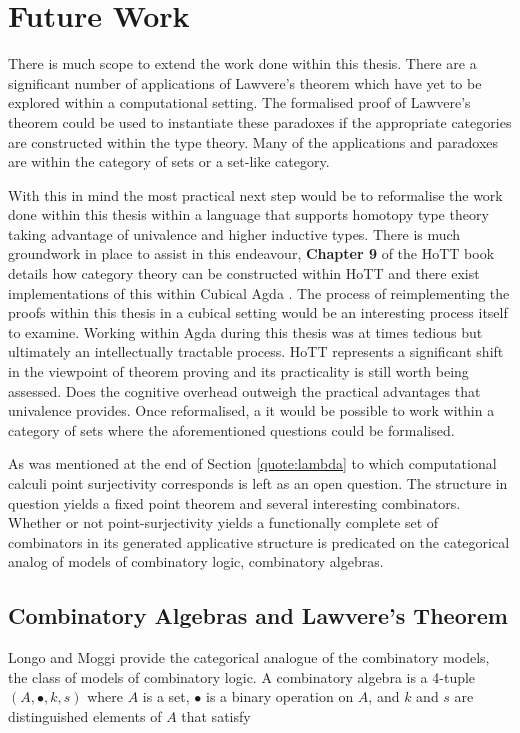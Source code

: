 \section{Future Work}
There is much scope to extend the work done within this thesis. There are a
significant number of applications of Lawvere's theorem which have yet to be
explored within a computational setting. The formalised proof of Lawvere's
theorem could be used to instantiate these paradoxes if the appropriate
categories are constructed within the type theory. Many of the applications and
paradoxes are within the category of sets or a set-like category.


With this in mind the most practical next step would be to reformalise the work
done within this thesis within a language that supports homotopy type theory
taking advantage of univalence and higher inductive types. There is much
groundwork in place to assist in this endeavour, \textbf{Chapter 9} of
the HoTT book details how category theory can be constructed within HoTT and
there exist implementations of this within Cubical Agda \cite{iverson2018cat}. The
process of reimplementing the proofs within this thesis in a cubical setting
would be an interesting process itself to examine. Working within Agda during
this thesis was at times tedious but ultimately an intellectually tractable
process. HoTT represents a significant shift in the viewpoint of theorem proving
and its practicality is still worth being assessed. Does the cognitive overhead
outweigh the practical advantages that univalence provides. Once reformalised, a
it would be possible to work within a category of sets where the aforementioned
questions could be formalised.


As was mentioned at the end of Section \ref{quote:lambda} to which computational
calculi point surjectivity corresponds is left as an open question. The
structure in question yields a fixed point theorem and several interesting
combinators. Whether or not point-surjectivity yields a functionally complete
set of combinators in its generated applicative structure is predicated on the
categorical analog of models of combinatory logic, combinatory algebras.

\subsection{Combinatory Algebras and Lawvere's Theorem}
\label{section:combin}
Longo and Moggi \cite{longo1990category} provide the categorical analogue of the combinatory models, the
class of models of combinatory logic. A combinatory algebra is a 4-tuple
$(A, \bullet, k, s)$ where $A$ is a set, $\bullet$ is a binary operation on
$A$, and $k$ and $s$ are distinguished elements of $A$ that satisfy

